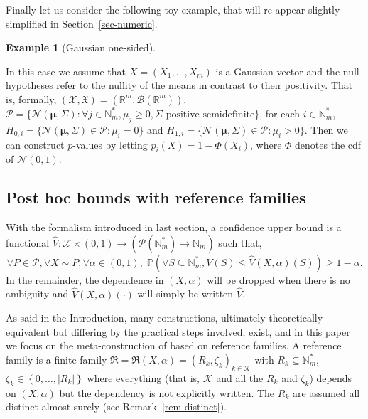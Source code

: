 \documentclass[
  11pt,
  a4paper,
]{article}
\theoremstyle{plain}
\theoremstyle{definition}
\newtheorem{example}{Example}[section]
\theoremstyle{plain}
\theoremstyle{definition}
\theoremstyle{plain}
\theoremstyle{remark}
\begin{document}
Finally let us consider the following toy example, that will re-appear
slightly simplified in Section~\ref{sec-numeric}.

\begin{example}[Gaussian
one-sided]\protect\hypertarget{exm-gauss}{}\label{exm-gauss}

In this case we assume that \(X=(X_1,\dotsc,X_m)\) is a Gaussian vector
and the null hypotheses refer to the nullity of the means in contrast to
their positivity. That is, formally,
\((\mathcal{X},\mathfrak{X})=(\mathbb R^m, \mathcal B\left(\mathbb R^m  \right))\),
\(\mathcal P=\{ \mathcal N(\boldsymbol{\mu}, \Sigma) : \forall j \in\mathbb{N}_m^*, \mu_j\geq 0, \Sigma \text{ positive semidefinite}  \}\),
for each \(i\in\mathbb{N}_m^*\),
\(H_{0,i}= \{ \mathcal N(\boldsymbol{\mu}, \Sigma) \in \mathcal P :\mu_i=0 \}\)
and
\(H_{1,i}=\{ \mathcal N(\boldsymbol{\mu}, \Sigma) \in \mathcal P :\mu_i>0 \}\).
Then we can construct \(p\)-values by letting \(p_i(X)=1-\Phi(X_i)\),
where \(\Phi\) denotes the cdf of \(\mathcal N(0,1)\).

\end{example}

\subsection{Post hoc bounds with reference
families}\label{sec-reference-fam}

With the formalism introduced in last section, a confidence upper bound
is a functional
\(\widehat V:\mathcal X\times (0,1)\to(\mathcal P(\mathbb{N}_m^*) \to \mathbb{N}_m)\)
such that, \begin{equation}
\forall P\in\mathcal P, \forall X\sim P, \forall \alpha \in (0,1),\; \mathbb{P}\left(\forall S \subseteq \mathbb{N}_m^*, V(S)\leq \widehat V(X,\alpha)(S)\right)\geq 1-\alpha.
\label{eq_confidence_formal}
\end{equation} In the remainder, the dependence in \((X,\alpha)\) will
be dropped when there is no ambiguity and
\(\widehat V(X,\alpha)(\cdot)\) will simply be written \(\widehat V\).

As said in the Introduction, many constructions, ultimately
theoretically equivalent but differing by the practical steps involved,
exist, and in this paper we focus on the meta-construction of
\citet{MR4124323} based on reference families. A reference family is a
finite family
\(\mathfrak{R}=\mathfrak{R}(X,\alpha)=(R_k,\zeta_k)_{k\in \mathcal K}\)
with \(R_k\subseteq\mathbb{N}_m^*\),
\(\zeta_k\in\left\{0,\dotsc,|R_k|\right\}\) where everything (that is,
\(\mathcal K\) and all the \(R_k\) and \(\zeta_k\)) depends on
\((X,\alpha)\) but the dependency is not explicitly written. The \(R_k\)
are assumed all distinct almost surely (see Remark~\ref{rem-distinct}).
\end{document}
